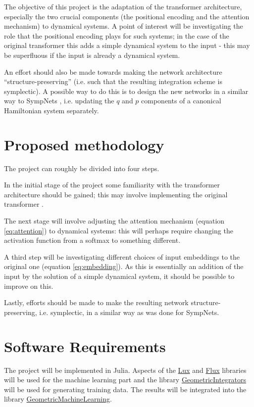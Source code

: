 \documentclass{article}
\begin{document}
The objective of this project is the adaptation of the transformer architecture, especially the two crucial components (the positional encoding and the attention mechanism) to dynamical systems. A point of interest will be investigating the role that the positional encoding plays for such systems; in the case of the original transformer this adds a simple dynamical system to the input - this may be superfluous if the input is already a dynamical system. 

An effort should also be made towards making the network architecture ``structure-preserving'' (i.e. such that the resulting integration scheme is symplectic). A possible way to do this is to design the new networks in a similar way to SympNets \cite{jin2020sympnets}, i.e. updating the $q$ and $p$ components of a canonical Hamiltonian system separately.  

\section{Proposed methodology}
The project can roughly be divided into four steps.

In the initial stage of the project some familiarity with the transformer architecture should be gained; this may involve implementing the original transformer \cite{vaswani2017attention}. 

The next stage will involve adjusting the attention mechanism (equation \eqref{eq:attention}) to dynamical systems: this will perhaps require changing the activation function from a softmax to something different. 

A third step will be investigating different choices of input embeddings to the original one (equation \eqref{eq:embedding}). As this is essentially an addition of the input by the solution of a simple dynamical system, it should be possible to improve on this. 

Lastly, efforts should be made to make the resulting network structure-preserving, i.e. symplectic, in a similar way as was done for SympNets. 

\section{Software Requirements}

The project will be implemented in Julia. Aspects of the \href{https://github.com/LuxDL/Lux.jl}{Lux} \cite{pal2022lux} and \href{https://github.com/FluxML/Flux.jl}{Flux} \cite{Flux.jl-2018} libraries will be used for the machine learning part and the library \href{https://github.com/JuliaGNI/GeometricIntegrators.jl}{GeometricIntegrators} \cite{Kraus:2020:GeometricIntegrators} will be used for generating training data. The results will be integrated into the library \href{https://github.com/JuliaGNI/GeometricMachineLearning.jl}{GeometricMachineLearning}.


\printbibliography
\end{document}
